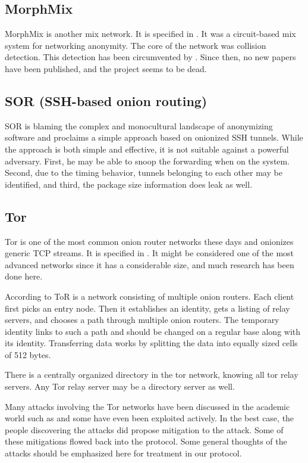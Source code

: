 \subsection{MorphMix}
MorphMix is another mix network. It is specified in \cite{morphmix:wpes2002}. It was a circuit-based mix system for networking anonymity. The core of the network was collision detection. This detection has been circumvented by \cite{morphmix:pet2006}. Since then, no new papers have been published, and the project seems to be dead.

\subsection{SOR (SSH-based onion routing)}
SOR \cite{Egners_2012} is blaming the complex and monocultural landscape of anonymizing software and proclaims a simple approach based on onionized SSH tunnels. While the approach is both simple and effective, it is not suitable against a powerful adversary. First, he may be able to snoop the forwarding when on the system. Second, due to the timing behavior, tunnels belonging to each other may be identified, and third, the package size information does leak as well.

\subsection{Tor\label{sec:tor}}
Tor is one of the most common onion router networks these days and onionizes generic TCP streams. It is specified in \cite{tor-spec}. It might be considered one of the most advanced networks since it has a considerable size, and much research has been done here.

According to \cite{onion-routing:pet2000} ToR is a network consisting of multiple onion routers. Each client first picks an entry node. Then it establishes an identity, gets a listing of relay servers, and chooses a path through multiple onion routers. The temporary identity links to such a path and should be changed on a regular base along with its identity. Transferring data works by splitting the data into equally sized cells of 512 bytes.

There is a centrally organized directory in the tor network, knowing all tor relay servers. Any Tor relay server may be a directory server as well. 

Many attacks involving the Tor networks have been discussed in the academic world such as \cite{hs-attack06,esorics13-cellflood,bauer:wpes2007,esorics12-torscan,oakland2013-trawling,danner-et-al:tissec12,congestion-longpaths} and some have even been exploited actively. In the best case, the people discovering the attacks did propose mitigation to the attack. Some of these mitigations flowed back into the protocol. Some general thoughts of the attacks should be emphasized here for treatment in our protocol.


